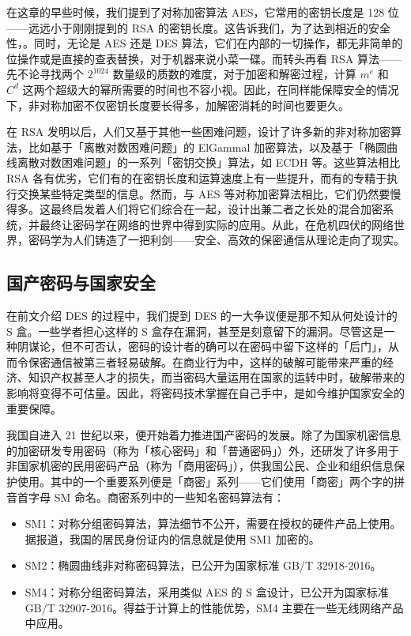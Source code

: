 在这章的早些时候，我们提到了对称加密算法 AES，它常用的密钥长度是 128 位——远远小于刚刚提到的 RSA 的密钥长度。这告诉我们，为了达到相近的安全性，。同时，无论是 AES 还是 DES 算法，它们在内部的一切操作，都无非简单的位操作或是直接的查表替换，对于机器来说小菜一碟。而转头再看 RSA 算法——先不论寻找两个 $2^{1024}$ 数量级的质数的难度，对于加密和解密过程，计算 $m^e$ 和 $C^d$ 这两个超级大的幂所需要的时间也不容小视。因此，在同样能保障安全的情况下，非对称加密不仅密钥长度要长得多，加解密消耗的时间也要更久。

在 RSA 发明以后，人们又基于其他一些困难问题，设计了许多新的非对称加密算法，比如基于「离散对数困难问题」的 ElGammal 加密算法，以及基于「椭圆曲线离散对数困难问题」的一系列「密钥交换」算法，如 ECDH 等。这些算法相比 RSA 各有优劣，它们有的在密钥长度和运算速度上有一些提升，而有的专精于执行交换某些特定类型的信息。然而，与 AES 等对称加密算法相比，它们仍然要慢得多。这最终启发着人们将它们综合在一起，设计出兼二者之长处的混合加密系统，并最终让密码学在网络的世界中得到实际的应用。从此，在危机四伏的网络世界，密码学为人们铸造了一把利剑——安全、高效的保密通信从理论走向了现实。

\subsection{国产密码与国家安全}

在前文介绍 DES 的过程中，我们提到 DES 的一大争议便是那不知从何处设计的 S 盒。一些学者担心这样的 S 盒存在漏洞，甚至是刻意留下的漏洞。尽管这是一种阴谋论，但不可否认，密码的设计者的确可以在密码中留下这样的「后门」，从而令保密通信被第三者轻易破解。在商业行为中，这样的破解可能带来严重的经济、知识产权甚至人才的损失，而当密码大量运用在国家的运转中时，破解带来的影响将变得不可估量。因此，将密码技术掌握在自己手中，是如今维护国家安全的重要保障。

我国自进入 21 世纪以来，便开始着力推进国产密码的发展。除了为国家机密信息的加密研发专用密码（称为「核心密码」和「普通密码」）外，还研发了许多用于非国家机密的民用密码产品（称为「商用密码」），供我国公民、企业和组织信息保护使用。其中的一个重要系列便是「商密」系列——它们使用「商密」两个字的拼音首字母 SM 命名。商密系列中的一些知名密码算法有：

\begin{itemize}
  \item SM1：对称分组密码算法，算法细节不公开，需要在授权的硬件产品上使用。据报道，我国的居民身份证内的信息就是使用 SM1 加密的。
  \item SM2：椭圆曲线非对称密码算法，已公开为国家标准 GB/T 32918-2016。
  \item SM4：对称分组密码算法，采用类似 AES 的 S 盒设计，已公开为国家标准 GB/T 32907-2016。得益于计算上的性能优势，SM4 主要在一些无线网络产品中应用。
\end{itemize}


